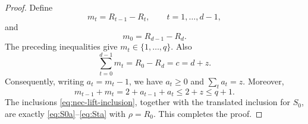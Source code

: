 \documentclass[10pt,a4paper]{amsart}
\begin{document}
\begin{proof}
Define
\[
        m_t=R_{t-1}-R_t,
        \qquad t=1,\ldots,d-1,
\]
and
\[
        m_0=R_{d-1}-R_d .
\]
The preceding inequalities give $m_t\in\{1,\ldots,q\}$.  Also
\[
        \sum_{t=0}^{d-1}m_t=R_0-R_d=c=d+z .
\]
Consequently, writing $a_t=m_t-1$, we have $a_t\ge0$ and $\sum_t a_t=z$. Moreover,
\[
        m_{t-1}+m_t=2+a_{t-1}+a_t\le 2+z\le q+1 .
\]
The inclusions \eqref{eq:nec-lift-inclusion}, together with the translated inclusion for $S_0$, are exactly \eqref{eq:S0a}--\eqref{eq:Sta} with $\rho=R_0$. This completes the proof.
\end{proof}
\end{document}
